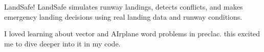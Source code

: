 LandSafe!
LandSafe simulates runway landings, detects conflicts, and makes emergency landing decisions using real landing data and runway conditions.

I loved learning about vector and AIrplane word problems in preclac. this excited me to dive deeper into it in my code.

